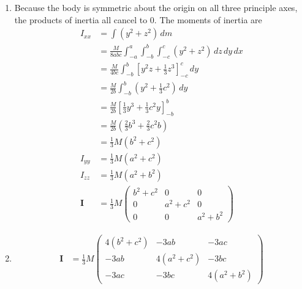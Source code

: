 \documentclass{article}
\renewcommand{\vec}[1]{\boldsymbol{\mathbf{#1}}}
\begin{document}
\begin{enumerate}
  \item Because the body is symmetric about the origin on all three principle axes, the products of inertia all cancel to $0$. The moments of inertia are \begin{align*}
          I_{x x} & = \int (y^2 + z^2) \,d m                                                              \\
                  & = \frac{M}{8 a b c} \int_{-a}^a \int_{-b}^b \int_{-c}^c (y^2 + z^2) \,d z \,d y \,d x \\
                  & = \frac{M}{4 b c} \int_{-b}^b \left[ y^2 z + \frac{1}{3} z^3 \right]_{-c}^c \,d y     \\
                  & = \frac{M}{2 b} \int_{-b}^b \left( y^2 + \frac{1}{3} c^2 \right) \,d y                \\
                  & = \frac{M}{2 b} \left[ \frac{1}{3} y^3 + \frac{1}{3} c^2 y \right]_{-b}^b             \\
                  & = \frac{M}{2 b} \left( \frac{2}{3} b^3 + \frac{2}{3} c^2 b \right)                    \\
                  & = \frac{1}{3} M (b^2 + c^2)                                                           \\
          I_{y y} & = \frac{1}{3} M (a^2 + c^2)                                                           \\
          I_{z z} & = \frac{1}{3} M (a^2 + b^2)                                                           \\
          \vec{I} & = \frac{1}{3} M \begin{pmatrix}
                                      b^2 + c^2 & 0         & 0         \\
                                      0         & a^2 + c^2 & 0         \\
                                      0         & 0         & a^2 + b^2
                                    \end{pmatrix}
        \end{align*}

  \item

        \begin{align*}
          \vec{I} & = \frac{1}{3} M \begin{pmatrix}
                                      4 (b^2 + c^2) & -3 a b        & -3 a c        \\
                                      -3 a b        & 4 (a^2 + c^2) & -3 b c        \\
                                      -3 a c        & -3 b c        & 4 (a^2 + b^2)
                                    \end{pmatrix}
        \end{align*}


\end{enumerate}
\end{document}
